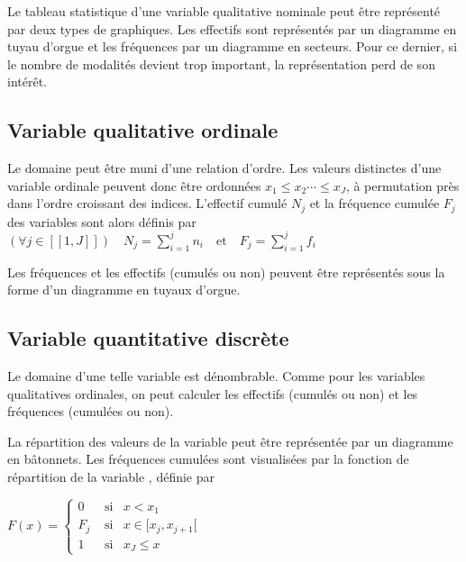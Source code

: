 \documentclass[letterpaper,10pt,french]{sphinxmanual}
\begin{document}
\sphinxAtStartPar
Le tableau statistique d’une variable qualitative nominale peut être représenté par deux types de graphiques. Les effectifs sont représentés par un diagramme en tuyau d’orgue et les fréquences par un diagramme en secteurs. Pour ce dernier, si le nombre de modalités devient trop important, la représentation perd de son intérêt.

\sphinxAtStartPar
{}


\subsection{Variable qualitative ordinale}
\label{\detokenize{statsdescriptives:variable-qualitative-ordinale}}
\ignorespaces 
\sphinxAtStartPar
Le domaine peut être muni d’une relation d’ordre.  Les valeurs distinctes d’une variable ordinale peuvent donc être ordonnées \(x_1\leq x_2\cdots\leq  x_J\), à permutation près dans l’ordre croissant des indices. L’effectif cumulé \(N_j\) et la fréquence cumulée \(F_j\) des variables sont alors définis par
\((\forall j\in[\![1,J]\!])\quad N_j=\displaystyle\sum_{i=1}^j n_i\quad \textrm {et}\quad F_j=\displaystyle\sum_{i=1}^j f_i\)

\sphinxAtStartPar
Les fréquences et les effectifs (cumulés ou non) peuvent être représentés sous la forme d’un diagramme en tuyaux d’orgue.


\subsection{Variable quantitative discrète}
\label{\detokenize{statsdescriptives:variable-quantitative-discrete}}
\ignorespaces 
\sphinxAtStartPar
Le domaine d’une telle variable est dénombrable. Comme pour les variables qualitatives ordinales, on peut calculer les effectifs (cumulés ou non) et les fréquences (cumulées ou non).

\sphinxAtStartPar
La répartition des valeurs de la variable peut être représentée par un diagramme en bâtonnets. Les fréquences cumulées  sont visualisées par la fonction de répartition de la variable , définie par

\sphinxAtStartPar
\(F(x) = \left \{
\begin{eqnarray}
0&\textrm{ si} &x<x_1\\
F_j &\textrm{ si}&  x\in[x_j,x_{j+1}[\\
1& \textrm{ si}&  x_J\leq x
\end{eqnarray}\right .\)
\end{document}
